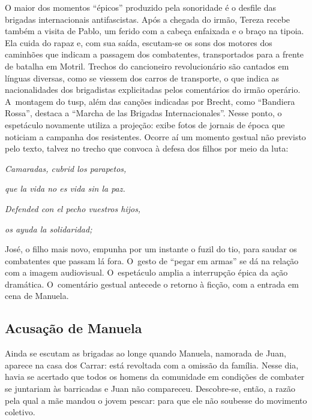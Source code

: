 {O maior dos momentos “épicos” produzido pela sonoridade é o desfile das
brigadas internacionais antifascistas. Após a chegada do irmão, Tereza
recebe também a visita de Pablo, um ferido com a cabeça enfaixada e o
braço na tipoia. Ela cuida do rapaz e, com sua saída, escutam-se os sons
dos motores dos caminhões que indicam a passagem dos combatentes,
transportados para a frente de batalha em Motril. Trechos do cancioneiro
revolucionário são cantados em línguas diversas, como se viessem dos
carros de transporte, o que indica as nacionalidades dos brigadistas
explicitadas pelos comentários do irmão operário. A~montagem do {\sc tusp},
além das canções indicadas por Brecht, como “Bandiera Rossa”,
destaca a “Marcha de las Brigadas Internacionales”. Nesse ponto, o espetáculo
novamente utiliza a projeção: exibe fotos de jornais de época
que noticiam a campanha dos resistentes. Ocorre aí um momento gestual
não previsto pelo texto, talvez no trecho que convoca à defesa dos
filhos por meio da luta:

\startblockquote
{\it Camaradas, cubrid los parapetos,}

{\it que la vida no es vida sin la paz.}

{\it Defended con el pecho vuestros hijos,}

{\it os ayuda la solidaridad;}
\stopblockquote

José, o filho mais novo, empunha por um instante o fuzil do tio, para
saudar os combatentes que passam lá fora. O~gesto de “pegar em armas” se
dá na relação com a imagem audiovisual. O~espetáculo amplia a
interrupção épica da ação dramática. O~comentário gestual antecede o
retorno à ficção, com a entrada em cena de Manuela.



\page

\subsection{Acusação de Manuela}

Ainda se escutam as brigadas ao longe quando Manuela, namorada de Juan,
aparece na casa dos Carrar: está revoltada com a omissão da família.
Nesse dia, havia se acertado que todos os homens da comunidade em
condições de combater se juntariam às barricadas e Juan não compareceu.
Descobre-se, então, a razão pela qual a mãe mandou o jovem pescar:
para que ele não soubesse do movimento coletivo.

}
